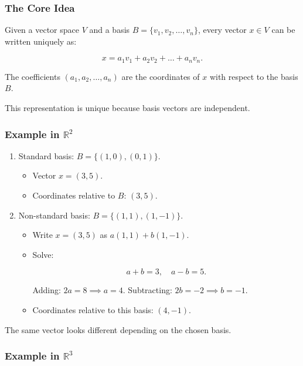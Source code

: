 \documentclass[
  letterpaper,
  DIV=11,
  numbers=noendperiod]{scrreprt}
\providecommand{\tightlist}{%
  \setlength{\itemsep}{0pt}\setlength{\parskip}{0pt}}
\begin{document}
\subsubsection{The Core Idea}\label{the-core-idea}

Given a vector space \(V\) and a basis \(B = \{v_1, v_2, \dots, v_n\}\),
every vector \(x \in V\) can be written uniquely as:

\[
x = a_1 v_1 + a_2 v_2 + \dots + a_n v_n.
\]

The coefficients \((a_1, a_2, \dots, a_n)\) are the coordinates of \(x\)
with respect to the basis \(B\).

This representation is unique because basis vectors are independent.

\subsubsection{\texorpdfstring{Example in
\(\mathbb{R}^2\)}{Example in \textbackslash mathbb\{R\}\^{}2}}\label{example-in-mathbbr2-1}

\begin{enumerate}
\def\labelenumi{\arabic{enumi}.}
\item
  Standard basis: \(B = \{(1,0), (0,1)\}\).

  \begin{itemize}
  \tightlist
  \item
    Vector \(x = (3,5)\).
  \item
    Coordinates relative to \(B\): \((3,5)\).
  \end{itemize}
\item
  Non-standard basis: \(B = \{(1,1), (1,-1)\}\).

  \begin{itemize}
  \item
    Write \(x = (3,5)\) as \(a(1,1) + b(1,-1)\).
  \item
    Solve:

    \[
    a+b = 3, \quad a-b = 5.
    \]

    Adding: \(2a = 8 \implies a = 4\). Subtracting:
    \(2b = -2 \implies b = -1\).
  \item
    Coordinates relative to this basis: \((4, -1)\).
  \end{itemize}
\end{enumerate}

The same vector looks different depending on the chosen basis.

\subsubsection{\texorpdfstring{Example in
\(\mathbb{R}^3\)}{Example in \textbackslash mathbb\{R\}\^{}3}}\label{example-in-mathbbr3}
\end{document}
